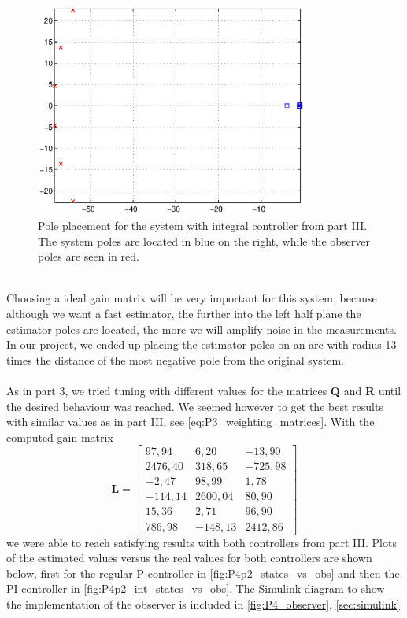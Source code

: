 \begin{figure}[htb]
	\centering
		\includegraphics[width=0.8\textwidth]{figures/Pole_placement_P4p2_integral.eps}
	\caption{Pole placement for the system with integral controller from part III. The system poles are located in blue on the right, while the observer poles are seen in red.}
\label{fig:Pole_placement_P4p2}
\end{figure}
\\
Choosing a ideal gain matrix will be very important for this system, because although we want a fast estimator, the further into the left half plane the estimator poles are located, the more we will amplify noise in the measurements. In our project, we ended up placing the estimator poles on an arc with radius 13 times the distance of the most negative pole from the original system.\\
\\As in part 3, we tried tuning with different values for the matrices \textbf{Q} and \textbf{R} until the desired behaviour was reached. We seemed however to get the best results with similar values as in part III, see \cref{eq:P3_weighting_matrices}. With the computed gain matrix
\begin{equation}\label{eq:L_P4p2}
\mathbf{L} = \begin{bmatrix}
97,94 & 6,20 & -13,90\\
2476,40 & 318,65 & -725,98\\
-2,47 & 98,99 &	1,78\\
-114,14 & 2600,04 &	80,90\\
15,36 & 2,71 & 96,90\\
786,98 & -148,13 & 2412,86
\end{bmatrix}
\end{equation}
we were able to reach satisfying results with both controllers from part III. Plots of the estimated values versus the real values for both controllers are shown below, first for the regular P controller in \cref{fig:P4p2_states_vs_obs} and then the PI controller in \cref{fig:P4p2_int_states_vs_obs}. The Simulink-diagram to show the implementation of the observer is included in \cref{fig:P4_observer}, \cref{sec:simulink}
